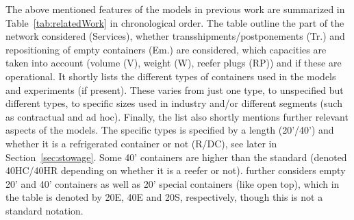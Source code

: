 The above mentioned features of the models in previous work are summarized in Table~\ref{tab:relatedWork} in chronological order. The table outline the part of the network considered (Services), whether transshipments/postponements (Tr.) and repositioning of empty containers (Em.) are considered, which capacities are taken into account (volume (V), weight (W), reefer plugs (RP)) and if these are operational. It shortly lists the different types of containers used in the models and experiments (if present). These varies from just one type, to unspecified but different types, to specific sizes used in industry and/or different segments (such as contractual and ad hoc).  Finally, the list also shortly mentions further relevant aspects of the models.
The specific types is specified by a length (20'/40') and whether it is a refrigerated container or not (R/DC), see later in Section~\ref{sec:stowage}. Some 40' containers are higher than the standard (denoted 40HC/40HR depending on whether it is a reefer or not). \citet{Lu10} further considers empty 20' and 40' containers as well as 20' special containers (like open top), which in the table is denoted by 20E, 40E and 20S, respectively, though this is not a standard notation.   
